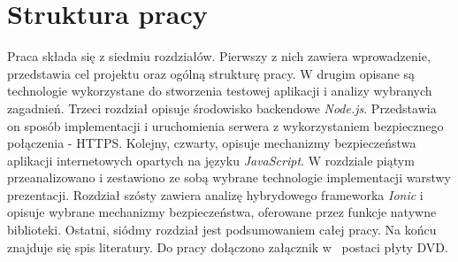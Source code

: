 \section{Struktura pracy}

Praca składa się z siedmiu rozdziałów. Pierwszy z nich zawiera wprowadzenie, przedstawia cel projektu oraz ogólną strukturę pracy. W drugim opisane są technologie wykorzystane do stworzenia testowej aplikacji i analizy wybranych zagadnień. Trzeci rozdział opisuje środowisko backendowe \textit{Node.js}. Przedstawia on sposób implementacji i uruchomienia serwera z wykorzystaniem bezpiecznego połączenia - HTTPS.  Kolejny, czwarty, opisuje mechanizmy bezpieczeństwa aplikacji internetowych opartych na języku \textit{JavaScript}. W rozdziale piątym przeanalizowano i zestawiono ze sobą wybrane technologie implementacji warstwy prezentacji. Rozdział szósty zawiera analizę hybrydowego frameworka \textit{Ionic} i opisuje wybrane mechanizmy bezpieczeństwa, oferowane przez funkcje natywne biblioteki. Ostatni, siódmy rozdział jest podsumowaniem całej pracy. Na końcu znajduje się spis literatury. Do pracy dołączono załącznik w~ postaci płyty DVD. 



